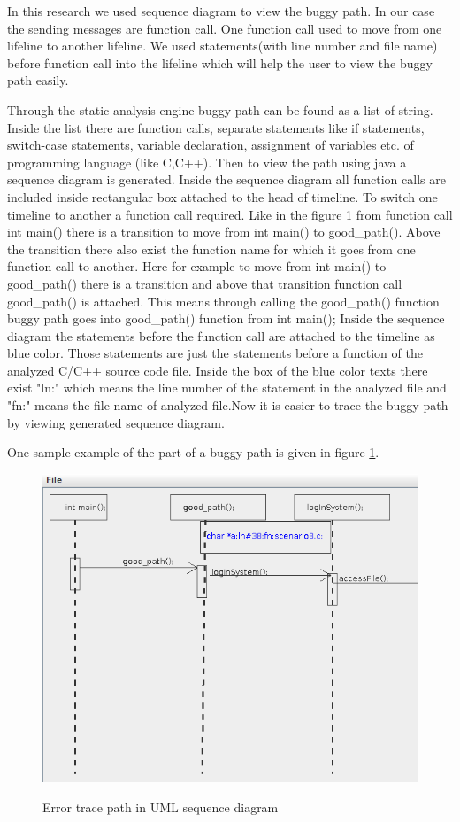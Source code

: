 In this research we used sequence diagram to view the buggy path. In our case the sending messages are function call. One function call used to move from one lifeline to another lifeline. We used statements(with line number and file name) before function call into the lifeline which will help the user to view the buggy path easily.

Through the static analysis engine buggy path can be found as a list of string. Inside the list there are function calls, separate statements like if statements, switch-case statements, variable declaration, assignment of variables etc. of programming language (like C,C++). Then to view the path using java a sequence diagram is generated. Inside the sequence diagram all function calls are included inside rectangular box attached to the head of timeline. To switch one timeline to another a function call required. Like in the figure \ref{Error_trace_path} from function call int main() there is a transition to move from int main() to good\_path(). Above the transition there also exist the function name for which it goes from one function call to another. Here for example to move from int main() to good\_path() there is a transition and above that transition function call good\_path() is attached. This means through calling the good\_path() function buggy path goes into good\_path() function from int main(); Inside the sequence diagram the statements before the function call are attached to the timeline as blue color. Those statements are just the statements before a function of the analyzed C/C++ source code file. Inside the box of the blue color texts there exist "ln:" which means the line number of the statement in the analyzed file and "fn:" means the file name of analyzed file.Now it is easier to trace the buggy path by viewing generated sequence diagram.

 One sample example of the part of a buggy path is given in figure \ref{Error_trace_path}.
\begin{figure}[htbp]
	\centering
	\includegraphics{styles/error_trace_path.png}
	\label{Error_trace_path}
	\caption{Error trace path in UML sequence diagram}
\end{figure}

